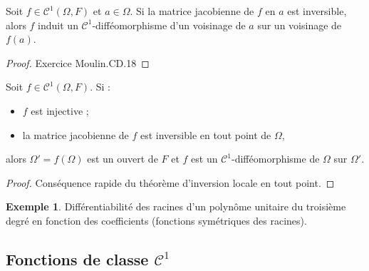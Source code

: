 \documentclass[french]{article}
\theoremstyle{plain}
\theoremstyle{definition}
\newtheorem*{ex}{Exemple}
\theoremstyle{remark}
\begin{document}
\begin{thm}%
	Soit $f\in\mathcal{C}^1(\Omega,F)$ et $a\in\Omega$. Si la matrice jacobienne de $f$ en $a$ est inversible, alors $f$ induit un $\mathcal{C}^1$-difféomorphisme d'un voisinage de $a$ sur un voisinage de $f(a)$.
\end{thm}
\begin{proof}
	Exercice Moulin.CD.18
\end{proof}

\begin{thm}
	Soit $f\in\mathcal{C}^1(\Omega,F)$. Si :
	\begin{itemize}
		\item $f$ est injective ;
		\item la matrice jacobienne de $f$ est inversible en tout point de $\Omega$,
	\end{itemize}
	alors $\Omega'=f(\Omega)$ est un ouvert de $F$ et $f$ est un $\mathcal{C}^1$-difféomorphisme de $\Omega$ sur $\Omega'$.
\end{thm}
\begin{proof}
	Conséquence rapide du théorème d'inversion locale en tout point.
\end{proof}

\begin{ex}
	Différentiabilité des racines d'un polynôme unitaire du troisième degré en fonction des coefficients (fonctions symétriques des racines).
\end{ex}

\subsection{Fonctions de classe $\mathcal{C}^1$}
\end{document}
